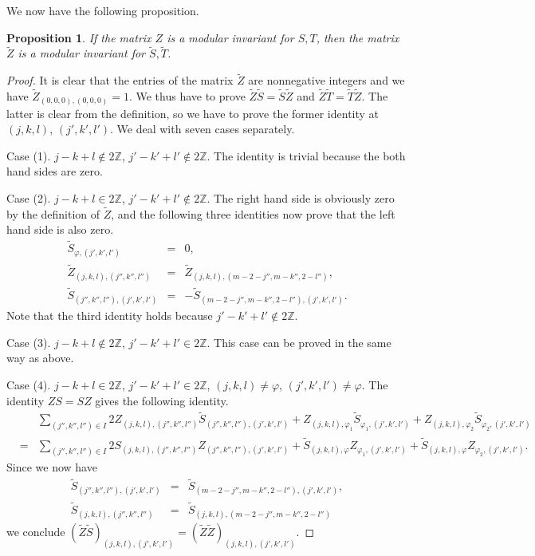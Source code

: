 \documentclass[11pt]{article}
\def\phi{\varphi}
\newtheorem{proposition}[theorem]{Proposition}
\def\Z{{\mathbb Z}}
\begin{document}
We now have the following proposition.
%
\begin{proposition}
If the matrix $Z$ is a modular invariant for $S, T$, then
the matrix $\tilde Z$ is a modular invariant for $\tilde S, \tilde T$.
\end{proposition}
%
\begin{proof}
It is clear that the entries of the matrix $\tilde Z$ are
nonnegative integers and we have $\tilde Z_{(0,0,0), (0,0,0)}=1$.
We thus have to prove $\tilde Z \tilde S=\tilde S \tilde Z$ and
$\tilde Z \tilde T=\tilde T \tilde Z$.
The latter is clear from the definition, so we have to prove
the former identity at $(j,k,l)$, $(j',k',l')$.
We deal with seven cases separately.

Case (1).  $j-k+l\notin2\Z$, $j'-k'+l'\notin2\Z$.
The identity is trivial because the both hand sides are zero.

Case (2).  $j-k+l\in2\Z$, $j'-k'+l'\notin2\Z$.
The right hand side is obviously zero by the definition of $\tilde Z$,
and the following three identities now prove that the left hand
side is also zero.
\begin{eqnarray*}
\tilde S_{\phi,(j',k',l')}&=&0,\\
\tilde Z_{(j,k,l),(j'',k'',l'')}&=&
\tilde Z_{(j,k,l),(m-2-j'',m-k'',2-l'')},\\
\tilde S_{(j'',k'',l''),(j',k',l')}&=&
-\tilde S_{(m-2-j'',m-k'',2-l''),(j',k',l')}.
\end{eqnarray*}
Note that the third identity holds because $j'-k'+l'\notin2\Z$.

Case (3).  $j-k+l\notin2\Z$, $j'-k'+l'\in2\Z$.
This case can be proved in the same way as above.

Case (4).  $j-k+l\in2\Z$, $j'-k'+l'\in2\Z$,
$(j,k,l)\neq \phi$, $(j',k',l')\neq \phi$.
The identity $ZS=SZ$ gives the following identity.
\begin{eqnarray*}
&&\sum_{(j'',k'',l'')\in I} 2Z_{(j,k,l),(j'',k'',l'')}
\tilde S_{(j'',k'',l''),(j',k',l')}+
Z_{(j,k,l),\phi_1}\tilde S_{\phi_1,(j',k',l')}+
Z_{(j,k,l),\phi_2}\tilde S_{\phi_2,(j',k',l')}\\
&=&\sum_{(j'',k'',l'')\in I} 2S_{(j,k,l),(j'',k'',l'')}
Z_{(j'',k'',l''),(j',k',l')}+
\tilde S_{(j,k,l),\phi} Z_{\phi_1,(j',k',l')}+
\tilde S_{(j,k,l),\phi} Z_{\phi_2,(j',k',l')}.
\end{eqnarray*}
Since we now have
\begin{eqnarray*}
\tilde S_{(j'',k'',l''),(j',k',l')}&=&
\tilde S_{(m-2-j'',m-k'',2-l''),(j',k',l')},\\
\tilde S_{(j,k,l),(j'',k'',l'')}&=&
\tilde S_{(j,k,l),(m-2-j'',m-k'',2-l'')}
\end{eqnarray*}
we conclude $(\tilde Z\tilde S)_{(j,k,l),(j',k',l')}
=(\tilde Z\tilde Z)_{(j,k,l),(j',k',l')}$.


\end{proof}
\end{document}
